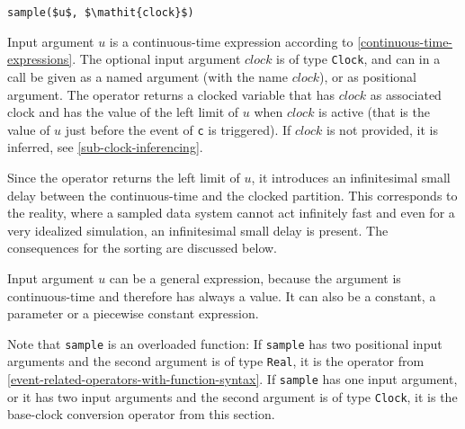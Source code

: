 \begin{operatordefinition*}[sample]\label{modelica:clocked-sample}
\begin{synopsis}\begin{lstlisting}
sample($u$, $\mathit{clock}$)
\end{lstlisting}\end{synopsis}
\begin{semantics}
Input argument $u$ is a continuous-time expression according to \cref{continuous-time-expressions}.
The optional input argument $\mathit{clock}$ is of type \lstinline!Clock!, and can in a call be given as a named argument (with the name $\mathit{clock}$), or as positional argument.
The operator returns a clocked variable that has $\mathit{clock}$ as associated clock and has the value of the left limit of $u$ when $\mathit{clock}$ is active (that is the value of $u$ just before the event of \lstinline!c! is triggered).
If $\mathit{clock}$ is not provided, it is inferred, see \cref{sub-clock-inferencing}.
\begin{nonnormative}
Since the operator returns the left limit of $u$, it introduces an infinitesimal small delay between the continuous-time and the clocked partition.  This corresponds to the reality, where a sampled data system cannot act infinitely fast and even for a very idealized simulation, an infinitesimal small delay is present.  The consequences for the sorting are discussed below.

Input argument $u$ can be a general expression, because the argument is continuous-time and therefore has always a value.  It can also be a constant, a parameter or a piecewise constant expression.

Note that \lstinline!sample! is an overloaded function:
If \lstinline!sample! has two positional input arguments and the second argument is of type \lstinline!Real!, it is the operator from \cref{event-related-operators-with-function-syntax}.
If \lstinline!sample! has one input argument, or it has two input arguments and the second argument is of type \lstinline!Clock!, it is the base-clock conversion operator from this section.
\end{nonnormative}
\end{semantics}
\end{operatordefinition*}

